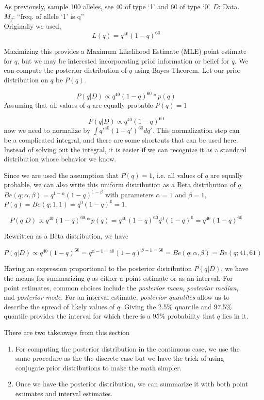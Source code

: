 \documentclass[12pt]{article}
\begin{document}
As previously, sample 100 alleles, see 40 of type `1' and 60 of type `0'. $D$: Data. $M_q$: ``freq. of allele `1' is q''\\

Originally we used,
\[
L(q) = q^{40} (1-q)^{60}
\]

Maximizing this provides a Maximum Likelihood Estimate (MLE) point estimate for $q$, but we may be interested incorporating prior information or belief for $q$. We can compute the posterior distribution of $q$ using Bayes Theorem. Let our prior distribution on $q$ be $P(q)$.

\[
P(q|D) \propto q^{40} (1-q)^{60} * p(q)
\]
Assuming that all values of $q$ are equally probable $P(q)=1$

\[
P(q|D) \propto q^{40} (1-q)^{60}
\]
 now we need to normalize by $\int q'^{40}(1-q')^{60} dq'$. This normalization step can be a complicated integral, and there are some shortcuts that can be used here. Instead of solving out the integral, it is easier if we can recognize it as a standard distribution whose behavior we know.

 Since we are used the assumption that $P(q)=1$, i.e. all values of $q$ are equally probable, we can also write this uniform distribution as a Beta distribution of $q$, $Be(q;\alpha,\beta)=q^{1-\alpha} (1-q)^{1-\beta}$ with parameters $\alpha=1$ and $\beta=1$, $P(q) = Be(q;1,1) = q^0 (1-q)^0 = 1$.

\[
P(q|D) \propto q^{40} (1-q)^{60} * p(q) =  q^{40} (1-q)^{60} q^0 (1-q)^0 = q^{40} (1-q)^{60}
\]

Rewritten as a Beta distribution, we have


\[
P(q|D) \propto q^{40} (1-q)^{60} = q^{\alpha -1 = 40} (1-q)^{\beta -1 = 60} = Be(q;\alpha,\beta) = Be(q;41,61)
\]

Having an expression proportional to the posterior distribution $P(q|D)$, we have the means for summarizing $q$ as either a point estimate or as an interval. For point estimates, common choices include the \emph{posterior mean}, \emph{posterior median}, and \emph{posterior mode}. For an interval estimate, \emph{posterior quantiles} allow us to describe the spread of likely values of $q$. Giving the 2.5\% quantile and 97.5\% quantile provides the interval for which there is a 95\% probability that $q$ lies in it.


There are two takeaways from this section

\begin{enumerate}
\item For computing the posterior distribution in the continuous case, we use the same procedure as the the discrete case but we have the trick of using conjugate prior distributions to make the math simpler.
\item Once we have the posterior distribution, we can summarize it with both point estimates and interval estimates.
\end{enumerate}
\end{document}
